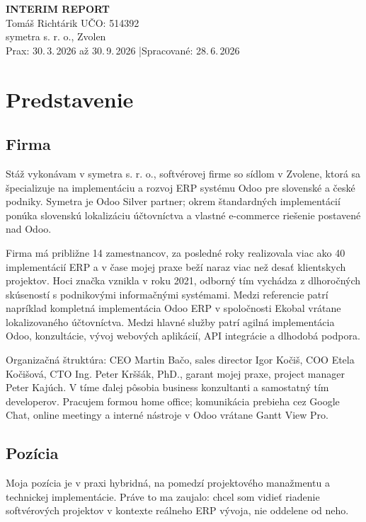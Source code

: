 \documentclass[12pt,a4paper]{article}
\begin{document}
\begin{center}
    {\LARGE\bfseries INTERIM REPORT}\\[0.6cm]
    {\large Tomáš Richtárik \quad UČO: 514392}\\[0.2cm]
    symetra s. r. o., Zvolen\\[0.2cm]
    Prax: 30.\,3.\,2026 až 30.\,9.\,2026 \quad|\quad Spracované: 28.\,6.\,2026
\end{center}
\vspace{0.5cm}

\section{Predstavenie}

\subsection{Firma}

Stáž vykonávam v symetra s. r. o., softvérovej firme so sídlom v Zvolene, ktorá sa špecializuje na implementáciu a rozvoj ERP systému Odoo pre slovenské a české podniky. Symetra je Odoo Silver partner; okrem štandardných implementácií ponúka slovenskú lokalizáciu účtovníctva a vlastné e-commerce riešenie postavené nad Odoo.

Firma má približne 14 zamestnancov, za posledné roky realizovala viac ako 40 implementácií ERP a v čase mojej praxe beží naraz viac než desať klientskych projektov. Hoci značka vznikla v roku 2021, odborný tím vychádza z dlhoročných skúseností s podnikovými informačnými systémami. Medzi referencie patrí napríklad kompletná implementácia Odoo ERP v spoločnosti Ekobal vrátane lokalizovaného účtovníctva. Medzi hlavné služby patrí agilná implementácia Odoo, konzultácie, vývoj webových aplikácií, API integrácie a dlhodobá podpora.

Organizačná štruktúra: CEO Martin Bačo, sales director Igor Kočiš, COO Etela Kočišová, CTO Ing. Peter Krššák, PhD., garant mojej praxe, project manager Peter Kajúch. V tíme ďalej pôsobia business konzultanti a samostatný tím developerov. Pracujem formou home office; komunikácia prebieha cez Google Chat, online meetingy a interné nástroje v Odoo vrátane Gantt View Pro.

\subsection{Pozícia}

Moja pozícia je v praxi hybridná, na pomedzí projektového manažmentu a technickej implementácie. Práve to ma zaujalo: chcel som vidieť riadenie softvérových projektov v kontexte reálneho ERP vývoja, nie oddelene od neho.
\end{document}
